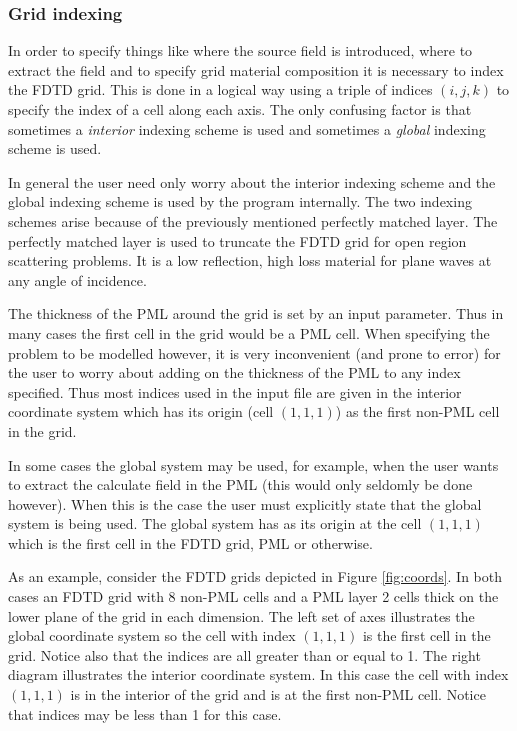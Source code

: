 \documentclass[a4paper, 12pt]{article}
\begin{document}
	\subsubsection{Grid indexing}
	\label{sec:gridscheme}
	In order to specify things like where the source field is introduced,
	where to extract the field and to specify grid material composition it
	is necessary to index the FDTD grid. This is done in a logical way
	using a triple of indices $(i,j,k)$ to specify the index of a cell
	along each axis. The only confusing factor is that sometimes a
	\emph{interior} indexing scheme is used and sometimes a \emph{global}
	indexing scheme is used.
	
	In general the user need only worry about the interior indexing scheme
	and the global indexing scheme is used by the program internally. The
	two indexing schemes arise because of the previously mentioned
	perfectly matched layer. The perfectly matched layer is used to
	truncate the FDTD grid for open region scattering problems. It is a
	low reflection, high loss material for plane waves at any angle of
	incidence.
	
	The thickness of the PML around the grid is set by an input
	parameter. Thus in many cases the first cell in the grid would be a
	PML cell. When specifying the problem to be modelled however, it is very
	inconvenient (and prone to error) for the user to worry about adding on the thickness of
	the PML to any index specified. Thus most indices used in the input
	file are given in the interior coordinate system which has its origin
	(cell $(1,1,1)$) as the first non-PML cell in the grid.
	
	In some cases the global system may be used, for example, when the
	user wants to extract the calculate field in the PML (this would only
	seldomly be done however). When this is the
	case the user must explicitly state that the global system is being
	used. The global system has as its origin at the cell $(1,1,1)$ which is
	the first cell in the FDTD grid, PML or otherwise.
	
	As an example, consider the FDTD grids depicted in Figure
	\ref{fig:coords}. In both cases an FDTD grid with 8 non-PML cells and
	a PML layer 2 cells thick on the lower plane of the grid in each
	dimension. The left set of axes illustrates the global coordinate
	system so the cell with index $(1,1,1)$ is the first cell in the
	grid. Notice also that the indices are all greater than or equal to
	1. The right diagram illustrates the interior coordinate system. In this
	case the cell with index $(1,1,1)$ is in the interior of the grid and
	is at the first non-PML cell. Notice that indices may be less than 1
	for this case.
	
\end{document}
